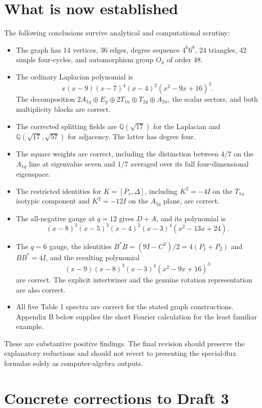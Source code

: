 \documentclass[11pt,a4paper]{article}
\newcommand{\Q}{\mathbb Q}\newcommand{\C}{\mathbb C}\newcommand{\R}{\mathbb R}
\begin{document}
\section{What is now established}
The following conclusions survive analytical and computational scrutiny:
\begin{itemize}
\item The graph has 14 vertices, 36 edges, degree sequence $4^6 6^8$, 24 triangles, 42 simple four-cycles, and automorphism group $O_h$ of order 48.
\item The ordinary Laplacian polynomial is
\[
 x(x-9)(x-7)^4(x-4)^2(x^2-9x+16)^3.
\]
The decomposition $2A_{1g}\oplus E_g\oplus2T_{1u}\oplus T_{2g}\oplus A_{2u}$, the scalar sectors, and both multiplicity blocks are correct.
\item The corrected splitting fields are $\Q(\sqrt{17})$ for the Laplacian and $\Q(\sqrt{17},\sqrt{57})$ for adjacency. The latter has degree four.
\item The square weights are correct, including the distinction between $4/7$ on the $A_{1g}$ line at eigenvalue seven and $1/7$ averaged over its full four-dimensional eigenspace.
\item The restricted identities for $K=[P_s,\Delta]$, including $K^2=-4I$ on the $T_{1u}$ isotypic component and $K^2=-12I$ on the $A_{1g}$ plane, are correct.
\item The all-negative gauge at $q=12$ gives $D+A$, and its polynomial is
\[
 (x-8)^3(x-5)^3(x-4)^2(x-3)^4(x^2-13x+24).
\]
\item The $q=6$ gauge, the identities $B^*B=(9I-C^2)/2=4(P_1+P_2)$ and $BB^*=4I$, and the resulting polynomial
\[
 (x-9)(x-8)^3(x-3)^4(x^2-9x+16)^3
\]
are correct. The explicit intertwiner and the genuine rotation representation are also correct.
\item All five Table 1 spectra are correct for the stated graph constructions. Appendix B below supplies the short Fourier calculation for the least familiar example.
\end{itemize}
These are substantive positive findings. The final revision should preserve the explanatory reductions and should not revert to presenting the special-flux formulas solely as computer-algebra outputs.

\section{Concrete corrections to Draft 3}
\end{document}
